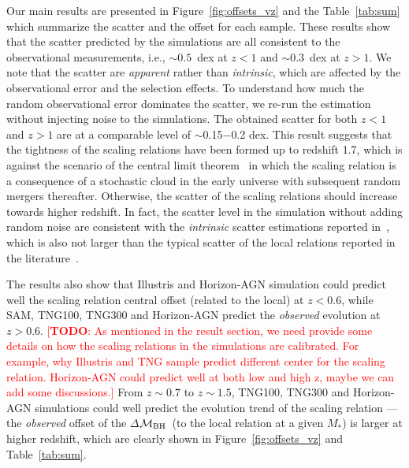 \documentclass[twocolumn]{aastex631}
\newcommand{\todo}[1]{\textcolor{red}{[{\bf TODO}: #1]}}
\def\smass{{$M_*$}}
\def\mbh{$\mathcal M_{\rm BH}$}
\begin{document}
Our main results are presented in Figure~\ref{fig:offsets_vz} and the Table~\ref{tab:sum} which summarize the scatter and the offset for each sample. These results show that the scatter predicted by the simulations are all consistent to the observational measurements, i.e., $\sim0.5$~dex at $z<1$ and $\sim0.3$~dex at $z>1$. We note that the scatter are {\it apparent} rather than {\it intrinsic}, which are affected by the observational error and the selection effects. To understand how much the random observational error dominates the scatter, we re-run the estimation without injecting noise to the simulations. The obtained scatter for both $z<1$ and $z>1$ are at a comparable level of $\sim$0.15$-$0.2 dex. This result suggests that the tightness of the scaling relations have been formed up to redshift 1.7, which is against the scenario of the central limit theorem~\citep{Peng2007, Jahnke2011, Hirschmann2010} in which the scaling relation is a consequence of a stochastic cloud in the early universe with subsequent random mergers thereafter. Otherwise, the scatter of the scaling relations should increase towards higher redshift. In fact, the scatter level in the simulation without adding random noise are consistent with the {\it intrinsic} scatter estimations reported in~\citet{Ding2020, 2021arXiv210902751L}, which is also not larger than the typical scatter of the local relations reported in the literature~\citep[][i.e., $\gtrsim0.35$~dex]{Kormendy13, Gul++09, Reines2015}.

The results also show that Illustris and Horizon-AGN simulation could predict well the scaling relation central offset (related to the local) at $z<0.6$, while SAM, TNG100, TNG300 and Horizon-AGN predict the {\it observed} evolution at $z>0.6$. \todo{As mentioned in the result section, we need provide some details on how the scaling relations in the simulations are calibrated. For example, why Illustris and TNG sample predict different center for the scaling relation. Horizon-AGN could predict well at both low and high z, maybe we can add some discussions.}
From $z\sim0.7$ to $z\sim1.5$, TNG100, TNG300 and Horizon-AGN simulations could well predict the evolution trend of the scaling relation --- the  {\it observed} offset of the $\Delta$\mbh\ (to the local relation at a given \smass) is larger at higher redshift, which are clearly shown in Figure~\ref{fig:offsets_vz} and Table~\ref{tab:sum}.
\end{document}
